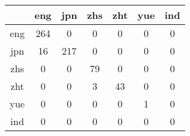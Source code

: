 \documentclass{article}
\begin{document}
\centering
\begin{table}[!h]

\begin{tabular}{|c|c|c|c|c|c|c|}
\hline 

& eng & jpn & zhs & zht & yue & ind \\
\hline 
eng & 264 & 0 & 0 & 0 & 0 & 0 \\
\hline 
jpn & 16 & 217 & 0 & 0 & 0 & 0 \\
\hline 
zhs & 0 & 0 & 79 & 0 & 0 & 0 \\
\hline 
zht & 0 & 0 & 3 & 43 & 0 & 0 \\
\hline 
yue & 0 & 0 & 0 & 0 & 1 & 0 \\
\hline 
ind & 0 & 0 & 0 & 0 & 0 & 0 \\
\hline

\end{tabular}
\end{table}
\end{document}
